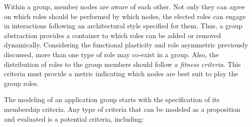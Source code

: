 









Within a group, member nodes are aware of each other. Not only they can agree on which roles should be performed by which nodes, the elected roles can engage in interactions following an architectural style specified for them. Thus, a group abstraction provides a container to which roles can be added or removed dynamically. Considering the functional plasticity and role asymmetric previously discussed, more than one type of role may co-exist in a group. Also, the distribution of roles to the group members should follow a \textit{fitness criteria}. This criteria must provide a metric indicating which nodes are best suit to play the group roles.

The modeling of an application group starts with the specification of its membership criteria. Any type of criteria that can be modeled as a proposition and evaluated is a potential criteria, including:

